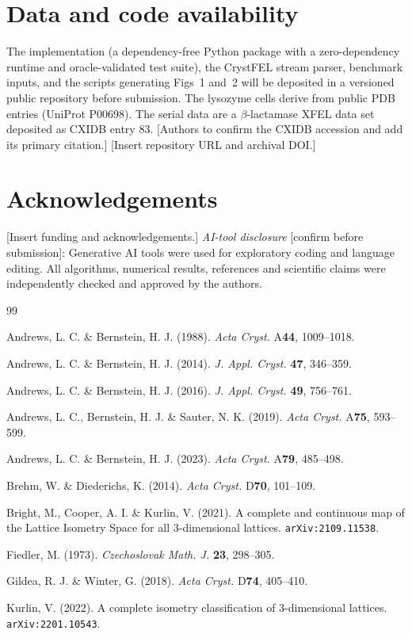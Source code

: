 \documentclass[11pt]{article}
\begin{document}
\section*{Data and code availability}

The implementation (a dependency-free Python package with a zero-dependency
runtime and oracle-validated test suite), the CrystFEL stream parser, benchmark
inputs, and the scripts generating Figs~1 and~2 will be deposited in a versioned
public repository before submission. The lysozyme cells derive from public PDB
entries (UniProt P00698). The serial data are a $\beta$-lactamase XFEL data set
deposited as CXIDB entry 83. [Authors to confirm the CXIDB accession and add its
primary citation.] [Insert repository URL and archival DOI.]

\section*{Acknowledgements}

[Insert funding and acknowledgements.] \emph{AI-tool disclosure} [confirm before
submission]: Generative AI tools were used for exploratory coding and language
editing. All algorithms, numerical results, references and scientific claims were
independently checked and approved by the authors.

\begin{thebibliography}{99}
\small

 Andrews, L. C. \& Bernstein, H. J. (1988).
\textit{Acta Cryst.} A\textbf{44}, 1009--1018.

 Andrews, L. C. \& Bernstein, H. J. (2014).
\textit{J. Appl. Cryst.} \textbf{47}, 346--359.

 Andrews, L. C. \& Bernstein, H. J. (2016).
\textit{J. Appl. Cryst.} \textbf{49}, 756--761.

 Andrews, L. C., Bernstein, H. J. \& Sauter, N. K. (2019).
\textit{Acta Cryst.} A\textbf{75}, 593--599.

 Andrews, L. C. \& Bernstein, H. J. (2023).
\textit{Acta Cryst.} A\textbf{79}, 485--498.

 Brehm, W. \& Diederichs, K. (2014).
\textit{Acta Cryst.} D\textbf{70}, 101--109.

 Bright, M., Cooper, A. I. \& Kurlin, V. (2021).
A complete and continuous map of the Lattice Isometry Space for all
3-dimensional lattices. \texttt{arXiv:2109.11538}.

 Fiedler, M. (1973).
\textit{Czechoslovak Math. J.} \textbf{23}, 298--305.

 Gildea, R. J. \& Winter, G. (2018).
\textit{Acta Cryst.} D\textbf{74}, 405--410.

 Kurlin, V. (2022).
A complete isometry classification of 3-dimensional lattices.
\texttt{arXiv:2201.10543}.

\end{thebibliography}
\end{document}
